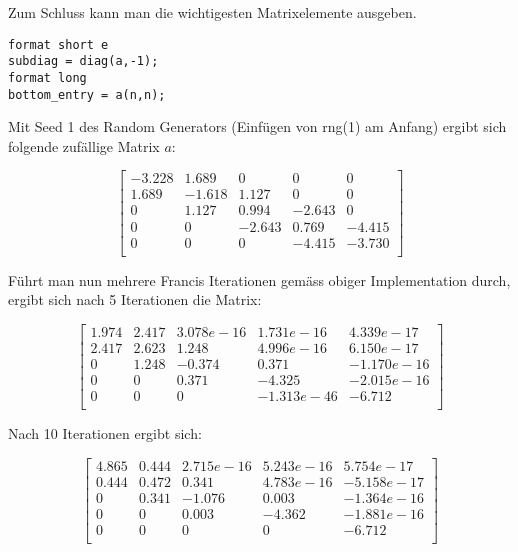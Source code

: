Zum Schluss kann man die wichtigesten Matrixelemente ausgeben.

\begin{lstlisting}
format short e
subdiag = diag(a,-1);
format long
bottom_entry = a(n,n);
\end{lstlisting}

Mit Seed 1 des Random Generators (Einfügen von rng(1) am Anfang) ergibt sich folgende zufällige Matrix $a$:

\begin{equation}
\begin{bmatrix}
-3.228 &	1.689 &	0 &	0 &	0\\
1.689 &	-1.618 & 1.127 & 0 &	0\\
0 &	1.127&	0.994 &	-2.643 &	0\\
0 &	0 &	-2.643 &	0.769 &	-4.415\\
0 &	0 &	0	& -4.415 & -3.730\\
\end{bmatrix}
\end{equation}

Führt man nun mehrere Francis Iterationen gemäss obiger Implementation durch, ergibt sich nach 5 Iterationen die Matrix:

\begin{equation}
\begin{bmatrix}
1.974 & 2.417	& 3.078e-16 & 1.731e-16 & 4.339e-17\\
2.417 & 2.623 & 1.248 & 4.996e-16 & 6.150e-17\\
0 & 1.248 & -0.374 & 0.371 & -1.170e-16\\
0 & 0 & 0.371 & -4.325 & -2.015e-16\\
0 & 0 & 0 &-1.313e-46 & -6.712\\
\end{bmatrix}
\end{equation}

Nach 10 Iterationen ergibt sich:

\begin{equation}
\begin{bmatrix}
4.865 & 0.444 & 2.715e-16 & 5.243e-16 & 5.754e-17\\
0.444 & 0.472 & 0.341 & 4.783e-16 & -5.158e-17\\
0 & 0.341 &-1.076 & 0.003 & -1.364e-16\\
0 & 0 & 0.003 & -4.362 & -1.881e-16\\
0 & 0 & 0 & 0 & -6.712\\
\end{bmatrix}
\end{equation}

